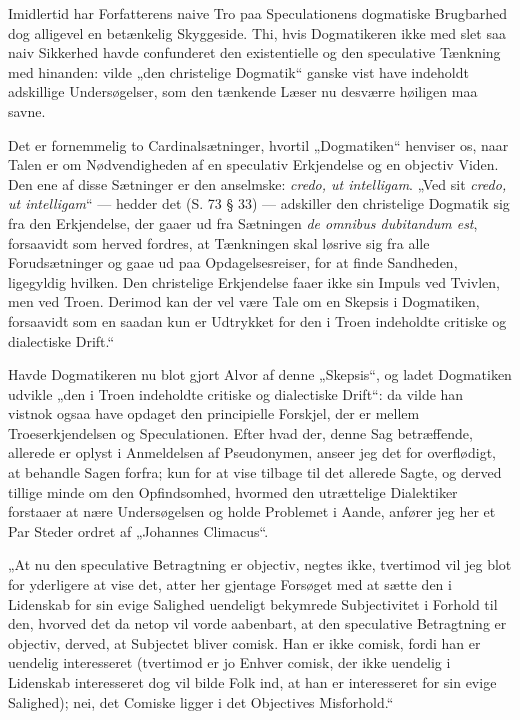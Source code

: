 Imidlertid har Forfatterens naive Tro paa Speculationens
dogmatiske Brugbarhed dog alligevel en betænkelig Skyggeside. Thi,
hvis Dogmatikeren ikke med slet saa naiv Sikkerhed havde
confunderet den existentielle og den speculative Tænkning med
hinanden: vilde „den christelige Dogmatik“ ganske vist have
indeholdt adskillige Undersøgelser, som den tænkende Læser nu
desværre høiligen maa savne.

 Det er fornemmelig to Cardinalsætninger, hvortil „Dogmatiken“
henviser os, naar Talen er om Nødvendigheden af en speculativ
Erkjendelse og en objectiv Viden. Den ene af disse Sætninger er
den anselmske: \textit{credo, ut intelligam}. „Ved sit
\textit{credo, ut intelligam}“ --- hedder det (S. 73 § 33) ---
adskiller den christelige Dogmatik sig fra den Erkjendelse, der
gaaer ud fra Sætningen \textit{de omnibus dubitandum est},
forsaavidt som herved fordres, at Tænkningen skal løsrive sig fra
alle Forudsætninger og gaae ud paa Opdagelsesreiser, for at finde
Sandheden, ligegyldig hvilken. Den christelige Erkjendelse faaer
ikke sin Impuls ved Tvivlen, men ved Troen. Derimod kan der vel
være Tale om en Skepsis i Dogmatiken, forsaavidt som en saadan kun
er Udtrykket for den i Troen indeholdte critiske og dialectiske
Drift.“

Havde Dogmatikeren nu blot gjort Alvor af denne „Skepsis“, og
ladet Dogmatiken udvikle „den i Troen indeholdte critiske og
dialectiske Drift“: da vilde han vistnok ogsaa have opdaget den
principielle Forskjel, der er mellem Troeserkjendelsen og
Speculationen. Efter hvad der, denne Sag betræffende, allerede er
oplyst i Anmeldelsen af Pseudonymen, anseer jeg det for
overflødigt, at behandle Sagen forfra; kun for at vise tilbage til
det allerede Sagte, og derved tillige minde om den Opfindsomhed,
hvormed den utrættelige Dialektiker forstaaer at nære
Undersøgelsen og holde Problemet i
 Aande, anfører jeg her et Par Steder ordret af „Johannes
Climacus“.

„At nu den speculative Betragtning er objectiv, negtes ikke,
tvertimod vil jeg blot for yderligere at vise det, atter her
gjentage Forsøget med at sætte den i Lidenskab for sin evige
Salighed uendeligt bekymrede Subjectivitet i Forhold til den,
hvorved det da netop vil vorde aabenbart, at den speculative
Betragtning er objectiv, derved, at Subjectet bliver comisk. Han
er ikke comisk, fordi han er uendelig interesseret (tvertimod er
jo Enhver comisk, der ikke uendelig i Lidenskab interesseret dog
vil bilde Folk ind, at han er interesseret for sin evige
Salighed); nei, det Comiske ligger i det Objectives Misforhold.“

